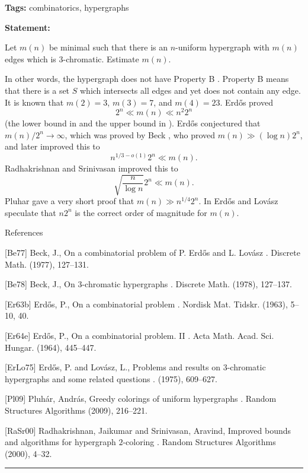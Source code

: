 \documentclass{article}
\begin{document}
\noindent\textbf{Tags:} combinatorics, hypergraphs

\medskip

\noindent\textbf{Statement:}

Let $m(n)$ be minimal such that there is an $n$-uniform hypergraph with $m(n)$ edges which is $3$-chromatic. Estimate $m(n)$.




In other words, the hypergraph does not have Property B . Property B means that there is a set $S$ which intersects all edges and yet does not contain any edge. It is known that $m(2)=3$, $m(3)=7$, and $m(4)=23$. Erd\H{o}s proved\[2^n \ll m(n) \ll n^2 2^n\](the lower bound in \cite{Er63b} and the upper bound in \cite{Er64e}). Erd\H{o}s conjectured that $m(n)/2^n\to \infty$, which was proved by Beck \cite{Be77}, who proved $m(n)\gg (\log n)2^n$, and later \cite{Be78} improved this to\[n^{1/3-o(1)}2^n \ll m(n).\]Radhakrishnan and Srinivasan \cite{RaSr00} improved this to\[\sqrt{\frac{n}{\log n}}2^n \ll m(n).\]Pluhar \cite{Pl09} gave a very short proof that $m(n) \gg n^{1/4}2^n$. In \cite{ErLo75} Erd\H{o}s and Lov\'{a}sz speculate that $n2^n$ is the correct order of magnitude for $m(n)$.




References

[Be77] Beck, J., On a combinatorial problem of {P}. {E}rd\H{o}s and {L}. {L}ov\'{a}sz . Discrete Math. (1977), 127--131.

[Be78] Beck, J., On {$3$}-chromatic hypergraphs . Discrete Math. (1978), 127--137.

[Er63b] Erd\H{o}s, P., On a combinatorial problem . Nordisk Mat. Tidskr. (1963), 5--10, 40.

[Er64e] Erd\H{o}s, P., On a combinatorial problem. {II} . Acta Math. Acad. Sci. Hungar. (1964), 445--447.

[ErLo75] Erd\H{o}s, P. and Lov\'{a}sz, L., Problems and results on {$3$}-chromatic hypergraphs and some related questions . (1975), 609--627.

[Pl09] Pluh\'{a}r, Andr\'{a}s, Greedy colorings of uniform hypergraphs . Random Structures Algorithms (2009), 216--221.

[RaSr00] Radhakrishnan, Jaikumar and Srinivasan, Aravind, Improved bounds and algorithms for hypergraph {$2$}-coloring . Random Structures Algorithms (2000), 4--32.

\noindent\rule{\linewidth}{0.4pt}


\end{document}
